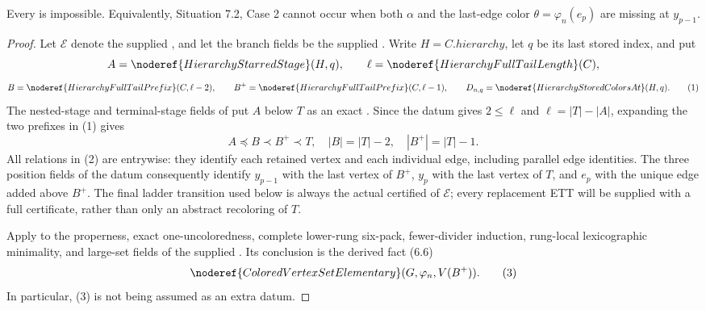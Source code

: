 \begin{lemma}
Every  is impossible.
Equivalently, Situation 7.2, Case 2 cannot occur when both
\(\alpha\) and the last-edge color \(\theta=\varphi_n(e_p)\) are
missing at \(y_{p-1}\).
\end{lemma}
\begin{proof}
Let \(\mathcal E\) denote the supplied
, and let the branch fields be the
supplied .  Write
\(H=C.\mathit{hierarchy}\), let \(q\) be its last stored index,
and put
\[
 A=\noderef{HierarchyStarredStage}(H,q),\qquad
 \ell=\noderef{HierarchyFullTailLength}(C),
\]
\[
 B=\noderef{HierarchyFullTailPrefix}(C,\ell-2),\qquad
 B^+=\noderef{HierarchyFullTailPrefix}(C,\ell-1),\qquad
 D_{n,q}=\noderef{HierarchyStoredColorsAt}(H,q).              \tag{1}
\]
The nested-stage and terminal-stage fields of
 put \(A\) below \(T\) as an exact
.  Since the datum gives
\(2\leq\ell\) and \(\ell=|T|-|A|\), expanding the two prefixes in
(1) gives
\[
 A\preccurlyeq B\prec B^+\prec T,
 \quad |B|=|T|-2,\quad |B^+|=|T|-1.                          \tag{2}
\]
All relations in (2) are entrywise: they identify each retained vertex
and each individual edge, including parallel edge identities.  The
three position fields of the datum consequently identify
\(y_{p-1}\) with the last vertex of \(B^+\), \(y_p\) with the last
vertex of \(T\), and \(e_p\) with the unique edge added above \(B^+\).
The final ladder transition used below is always the actual certified
 of \(\mathcal E\); every replacement ETT
will be supplied with a full
 certificate, rather than
only an abstract recoloring of \(T\).

Apply  to the
properness, exact one-uncoloredness, complete lower-rung six-pack,
fewer-divider induction, rung-local lexicographic minimality, and
large-set fields of the supplied
.  Its conclusion is the
derived fact (6.6)
\[
       \noderef{ColoredVertexSetElementary}
          (G,\varphi_n,V(B^+)).                               \tag{3}
\]
In particular, (3) is not being assumed as an extra datum.


\end{proof}
